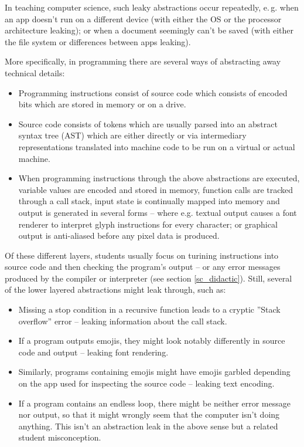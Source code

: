 In teaching computer science, such leaky abstractions occur repeatedly, e.\,g. when an app doesn't run on a different device (with either the OS or the processor architecture leaking); or when a document seemingly can't be saved (with either the file system or differences between apps leaking).

More specifically, in programming there are several ways of abstracting away technical details:

\begin{itemize}
\item Programming instructions consist of source code which consists of encoded bits which are stored in memory or on a drive.
\item Source code consists of tokens which are usually parsed into an abstract syntax tree (AST) which are either directly or via intermediary representations translated into machine code to be run on a virtual or actual machine.
\item When programming instructions through the above abstractions are executed, variable values are encoded and stored in memory, function calls are tracked through a call stack, input state is continually mapped into memory and output is generated in several forms -- where e.g. textual output causes a font renderer to interpret glyph instructions for every character; or graphical output is anti-aliased before any pixel data is produced.
\end{itemize}

Of these different layers, students usually focus on turining instructions into source code and then checking the program's output -- or any error messages produced by the compiler or interpreter (see section \ref{sc_didactic}). Still, several of the lower layered abstractions might leak through, such as:

\begin{itemize}
\item Missing a stop condition in a recursive function leads to a cryptic ''Stack overflow'' error -- leaking information about the call stack.
\item If a program outputs emojis, they might look notably differently in source code and output -- leaking font rendering.
\item Similarly, programs containing emojis might have emojis garbled depending on the app used for inspecting the source code -- leaking text encoding.
\item If a program contains an endless loop, there might be neither error message nor output, so that it might wrongly seem that the computer isn't doing anything. This isn't an abstraction leak in the above sense but a related student misconception.
\end{itemize}


